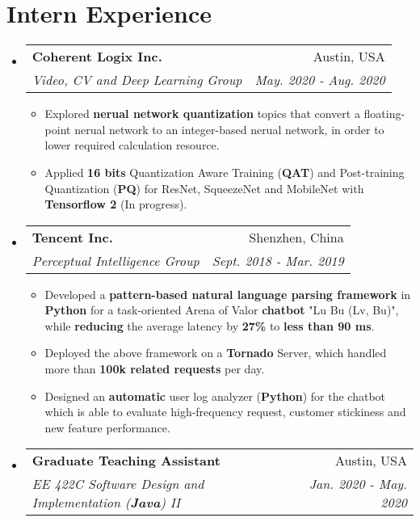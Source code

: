 \documentclass[letterpaper,11pt]{article}
\makeatletter
\newcommand{\resumeItem}[1]{
  \item\small{
    {#1}
  }
}
\newcommand{\resumeSubheading}[4]{
  \vspace{-1pt}\item
    \begin{tabular*}{0.97\textwidth}[t]{l@{\extracolsep{\fill}}r}
      \textbf{#1} & #2 \\
      \textit{\small#3} & \textit{\small #4} \\
    \end{tabular*}\vspace{-5pt}
}
\newcommand{\resumeSubHeadingListStart}{\begin{itemize}[leftmargin=*]}
\newcommand{\resumeSubHeadingListEnd}{\end{itemize}}
\newcommand{\resumeItemListStart}{\begin{itemize}}
\newcommand{\resumeItemListEnd}{\end{itemize}\vspace{-5pt}}
\makeatother
\begin{document}
\section{Intern Experience}
  \resumeSubHeadingListStart
  	\resumeSubheading
  	{Coherent Logix Inc.}{Austin, USA}
  	{Video, CV and Deep Learning Group}{May. 2020 - Aug. 2020}
  	\resumeItemListStart
  	\resumeItem
  	{Explored \textbf{nerual network quantization} topics that convert a floating-point nerual network to an integer-based nerual network, in order to lower required calculation resource.}
  	\resumeItem
  	{Applied \textbf{16 bits} Quantization Aware Training (\textbf{QAT}) and Post-training Quantization (\textbf{PQ}) for ResNet, SqueezeNet and MobileNet with \textbf{Tensorflow 2} (In progress).}
  	\resumeItemListEnd
  	
    \resumeSubheading
      {Tencent Inc.}{Shenzhen, China}
      {Perceptual Intelligence Group}{Sept. 2018 - Mar. 2019}
      \resumeItemListStart
      	\resumeItem
      	  {Developed a \textbf{pattern-based natural language parsing framework} in \textbf{Python} for a task-oriented Arena of Valor \textbf{chatbot} "Lu Bu (Lv, Bu)", while \textbf{reducing} the average latency by \textbf{27\%} to \textbf{less than 90 ms}.}
      	\resumeItem
          {Deployed the above framework on a \textbf{Tornado} Server, which handled more than \textbf{100k related requests} per day. }
        \resumeItem
          {Designed an \textbf{automatic} user log analyzer (\textbf{Python}) for the chatbot which is able to evaluate high-frequency request, customer stickiness and new feature performance.}
      \resumeItemListEnd
      \resumeSubheading
      {Graduate Teaching Assistant}{Austin, USA}
      {EE 422C Software Design and Implementation (\textbf{Java}) II }{Jan. 2020 - May. 2020}
      
      \resumeSubHeadingListEnd
      
\end{document}
